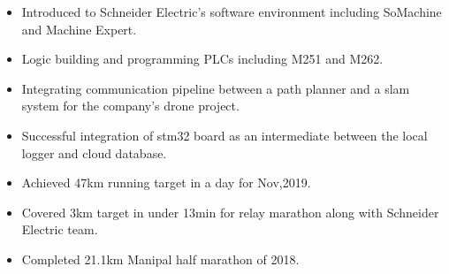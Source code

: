 \documentclass[10pt,a4paper,ragged2e]{altacv}
\begin{document}

\begin{fullwidth}
\makecvheader
\end{fullwidth}



\begin{itemize}
\item Introduced to Schneider Electric’s software environment including SoMachine and Machine Expert.
\smallskip
\item Logic building and programming PLCs including M251 and M262.
\end{itemize}

\divider

\begin{itemize}
\item Integrating communication pipeline between a path planner and a slam system for the company’s drone project. 
\smallskip
\item Successful integration of stm32 board as an intermediate between the local logger and cloud database.
\end{itemize}


\smallskip
\begin{itemize}
\item Achieved 47km running target in a day for Nov,2019.
\smallskip
\item Covered 3km target in under 13min for relay marathon along with Schneider Electric team.
\smallskip
\item Completed 21.1km Manipal half marathon of 2018.
\end{itemize}
\end{document}
